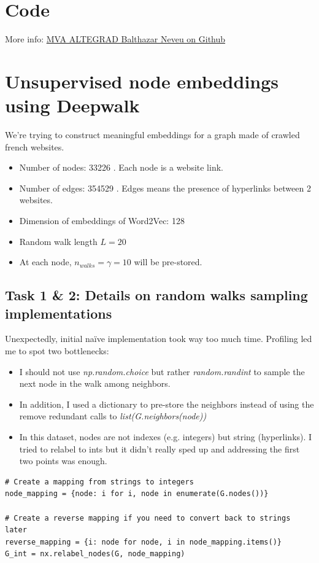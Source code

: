 \documentclass[a4paper]{article}
\begin{document}

\section*{Code}

More info:
\href{https://github.com/balthazarneveu/MVA23_ALTEGRAD/#readme}{MVA ALTEGRAD Balthazar Neveu on Github}

\section{Unsupervised node embeddings using Deepwalk}

We're trying to construct meaningful embeddings for a graph made of crawled french websites.

\begin{itemize}
    \item Number of nodes: 33226 . Each node is a website link.
    \item Number of edges: 354529 . Edges means the presence of hyperlinks between 2 websites.
    \item Dimension of embeddings of Word2Vec: 128
    \item Random walk length $L = 20$
    \item At each node, $n_{walks}=\gamma=10$ will be pre-stored.
\end{itemize}

\subsection*{Task 1 \& 2: Details on random walks sampling implementations}
Unexpectedly, initial naïve implementation took way too much time. 
Profiling led me to spot two bottlenecks:
\begin{itemize}
    \item I should not use \textit{np.random.choice} but rather \textit{random.randint} 
    to sample the next node in the walk
among neighbors.
    \item In addition, I used a dictionary to pre-store the neighbors instead of using the remove redundant calls to \textit{list(G.neighbors(node))}
    \item In this dataset, nodes are not indexes (e.g. integers) but string (hyperlinks).
    I tried to relabel to ints but it didn't really sped up and addressing the first two points was enough.
\end{itemize}

\begin{verbatim}
# Create a mapping from strings to integers
node_mapping = {node: i for i, node in enumerate(G.nodes())}

# Create a reverse mapping if you need to convert back to strings later
reverse_mapping = {i: node for node, i in node_mapping.items()}
G_int = nx.relabel_nodes(G, node_mapping)
\end{verbatim}
\end{document}
